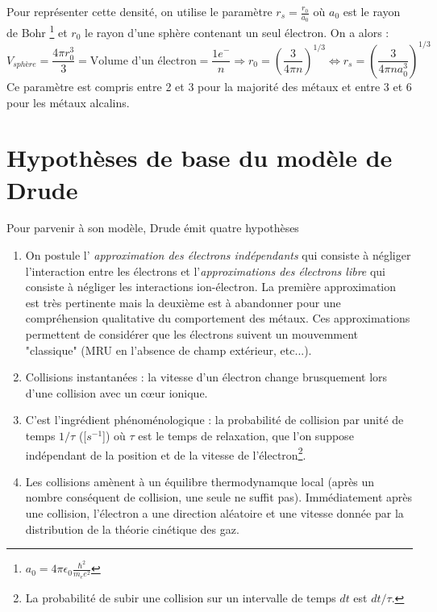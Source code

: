 	\noindent
	Pour représenter cette densité, on utilise le paramètre $ r_s = \frac{r_0}{a_0}$
	où $a_0$ est le rayon de Bohr \footnote{$a_0 = 4 \pi \epsilon_0 \frac{\hbar^2}{m_e e^2}$}
	et $r_0$ le rayon d'une sphère contenant un seul 
	électron. On a alors : 
	\begin{equation}
	V_{sphère} = \frac{4\pi r^3_0}{3} = \text{Volume d'un électron} = \frac{1 e^-}{n} 
	\Longrightarrow r_0 = \left(\frac{3}{4\pi n}\right)^{1/3} \Longleftrightarrow r_s 
	= \left(\frac{3}{4\pi n a_0^3}\right)^{1/3}
	\end{equation}
	Ce paramètre est compris entre 2 et 3 pour la majorité des métaux et entre 3 et 6 
	pour les métaux alcalins.
	
\newpage
\section{Hypothèses de base du modèle de Drude}
Pour parvenir à son modèle, Drude émit quatre hypothèses

\begin{enumerate}
\item 
On postule l'\textit{
approximation des électrons indépendants} qui consiste à négliger l'interaction 
entre les électrons et l'\textit{approximations des électrons libre} qui consiste 
à négliger les interactions ion-électron. La première approximation est très
 pertinente mais la deuxième est à abandonner pour une compréhension qualitative du
 comportement des métaux. Ces approximations permettent de considérer que les électrons
 suivent un mouvemment "classique" (MRU en l'absence de champ extérieur, etc...).

\item Collisions instantanées : la vitesse d'un électron change brusquement 
lors d'une collision avec un cœur ionique.
		
\item C'est l'ingrédient phénoménologique : la probabilité de collision par unité de temps 
$1/\tau$ ([$s^{-1}$]) où $\tau$ est le temps de relaxation, que l'on suppose 
indépendant de la position et de la vitesse de l'électron\footnote{La probabilité 
de subir une collision sur un intervalle de temps $dt$ est $dt/\tau$.}.

\item Les collisions amènent à un équilibre thermodynamque local
 (après un nombre conséquent de collision, une seule ne suffit pas).
 Immédiatement après une collision, l'électron a une direction aléatoire et une 
 vitesse donnée par la distribution de la théorie cinétique des gaz.
\end{enumerate}


